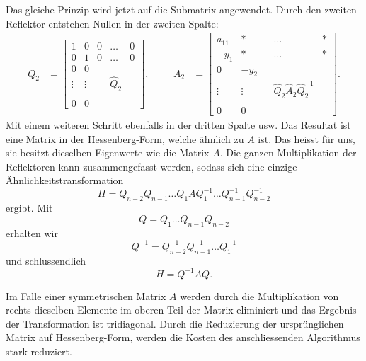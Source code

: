 Das gleiche Prinzip wird jetzt auf die Submatrix angewendet.
Durch den zweiten Reflektor entstehen Nullen in der zweiten Spalte:
\begin{align*}
	Q_{2}&=
	\begin{bmatrix}
	1 & 0 & 0 & \dots & 0\\
	0 & 1 & 0 & \dots & 0\\
	0 & 0 &\\
	\vdots & \vdots & &\hat{Q}_2 &\\
	 &  &\\
	0 & 0 &
	\end{bmatrix},
&&&
	A_{2}&=
	\begin{bmatrix}
	a_{11} & * &  & \dots & *\\
	-y_{1} & * &  & \dots & *\\
	0 & -y_{2} &\\
	\vdots & \vdots  & &\hat{Q}_2\hat{A}_{2}\hat{Q}_2^{-1} &\\
	 &  &\\
	0 & 0 &
	\end{bmatrix}.
\end{align*}
Mit einem weiteren Schritt ebenfalls in der dritten Spalte usw.
Das Resultat ist eine Matrix in der Hessenberg-Form, welche ähnlich zu $A$ ist.
Das heisst für uns, sie besitzt dieselben Eigenwerte wie die Matrix $A$.
Die ganzen Multiplikation der Reflektoren kann zusammengefasst werden, sodass sich eine einzige Ähnlichkeitstransformation
\begin{equation}
	H=Q_{n-2}Q_{n-1}\dots Q_{1}AQ_{1}^{-1}\dots Q_{n-1}^{-1}Q_{n-2}^{-1}
\end{equation}
ergibt.
Mit 
\begin{equation}
	Q=Q_{1}\dots Q_{n-1}Q_{n-2}
\end{equation}
erhalten wir
\begin{equation}
	Q^{-1} = Q_{n-2}^{-1}Q_{n-1}^{-1}\dots Q_{1}^{-1}
\end{equation}
und schlussendlich
\begin{equation}
H=Q^{-1}AQ.
\end{equation}

Im Falle einer symmetrischen Matrix $A$ werden durch die Multiplikation von rechts dieselben Elemente im oberen Teil der Matrix eliminiert und das Ergebnis der Transformation ist tridiagonal.
Durch die Reduzierung der ursprünglichen Matrix auf Hessenberg-Form, werden die Kosten des anschliessenden Algorithmus stark reduziert.
